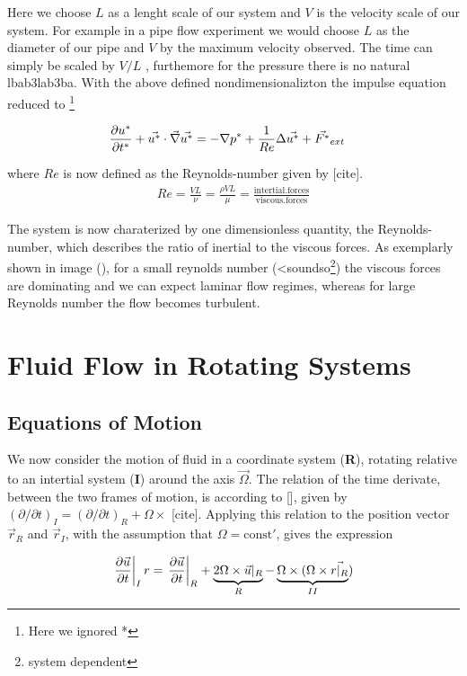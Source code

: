Here we choose $L$ as a lenght scale of our system and $V$ is the velocity scale of our system.
For example in a pipe flow experiment we would choose $L$ as the diameter of our pipe and $V$ by the maximum velocity observed.
The time can simply be scaled  by $V/L$ , furthemore for the pressure there is no natural lbab3lab3ba.
With the above defined nondimensionalizton the impulse equation reduced to \footnote{Here we ignored *}

\begin{align}
    \pdn[u^*]{t^*} + \vec{u^*} \cdot \vec{\nabla} \vec{u^*} &= -\nabla p^* + \frac{1}{Re} \Delta \vec{u^*} + \vec{F^*}_{ext}
\end{align}

where $Re$ is now defined as the Reynolds-number given by [cite].
\begin{align}
    Re = \frac{VL}{\nu} = \frac{\rho VL}{\mu} = \frac{\mathrm{intertial.forces}}{\mathrm{viscous.forces}}
\end{align}

The system is now charaterized by one dimensionless quantity, the Reynolds-number, which describes the ratio of inertial to the viscous forces.
As exemplarly shown in image (),  for a small reynolds number (<soundso\footnote{system dependent})  the viscous forces are dominating and we can expect laminar flow regimes, whereas for
large Reynolds number the flow becomes turbulent.

\newpage

\section{Fluid Flow in Rotating Systems}
\subsection{Equations of Motion}

We now consider the motion of fluid in a coordinate system (\textbf{R}), rotating relative to an intertial system (\textbf{I}) around the axis $\vec{\Omega}$.
The relation of the time derivate, between the two frames of motion, is according to [], given by $(\partial/\partial t)_I = (\partial/\partial t)_R + \Omega \times $ [cite].
Applying this relation to the position vector $\vec{r}_R$ and  $\vec{r}_I$, with the assumption that $\Omega=\mathrm{const'}$, gives the expression

\begin{align}
    \left.\pdn[\vec{u}]{t}\right|_I r= \left.\pdn[\vec{u}]{t}\right|_R   + \underbrace{2\Omega \times \vec{u}|_R}_{R} - \underbrace{\Omega \times (\Omega \times \vec{r|_R}}_{II})
\end{align}

